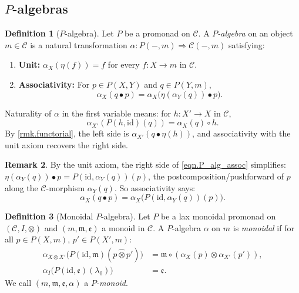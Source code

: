 \documentclass[11pt]{article}
\theoremstyle{definition}
\newtheorem{definition}{Definition}[section]
\newtheorem{remark}[definition]{Remark}
\newcommand{\id}{\mathrm{id}}
\newcommand{\cat}[1]{\mathcal{#1}}
\begin{document}
\subsection{$P$-algebras}

\begin{definition}[$P$-algebra]\label{def.P_alg}
Let $P$ be a promonad on $\cat{C}$. A \emph{$P$-algebra} on an object $m\in\cat{C}$ is a natural transformation $\alpha\colon P(-,m)\Rightarrow\cat{C}(-,m)$ satisfying:
\begin{enumerate}
\item \textbf{Unit:} $\alpha_X(\eta(f))=f$ for every $f\colon X\to m$ in $\cat{C}$.
\item \textbf{Associativity:} For $p\in P(X,Y)$ and $q\in P(Y,m)$,
\begin{equation}\label{eqn.P_alg_assoc}
\alpha_X(q\bullet p)=\alpha_X\bigl(\eta(\alpha_Y(q))\bullet p\bigr).
\end{equation}
\end{enumerate}
Naturality of $\alpha$ in the first variable means: for $h\colon X'\to X$ in $\cat{C}$,
\begin{equation}\label{eqn.alpha_nat}
\alpha_{X'}(P(h,\id)(q))=\alpha_X(q)\circ h.
\end{equation}
By \cref{rmk.functorial}, the left side is $\alpha_{X'}(q\bullet\eta(h))$, and associativity with the unit axiom recovers the right side.
\end{definition}

\begin{remark}\label{rmk.assoc_push}
By the unit axiom, the right side of \eqref{eqn.P_alg_assoc} simplifies: $\eta(\alpha_Y(q))\bullet p=P(\id,\alpha_Y(q))(p)$, the postcomposition/pushforward of $p$ along the $\cat{C}$-morphism $\alpha_Y(q)$. So associativity says:
\[
\alpha_X(q\bullet p)=\alpha_X\bigl(P(\id,\alpha_Y(q))(p)\bigr).
\]
\end{remark}

\begin{definition}[Monoidal $P$-algebra]\label{def.monoidal_P_alg}
Let $P$ be a lax monoidal promonad on $(\cat{C},I,\otimes)$ and $(m,\mathfrak{m},\mathfrak{e})$ a monoid in $\cat{C}$. A $P$-algebra $\alpha$ on $m$ is \emph{monoidal} if for all $p\in P(X,m)$, $p'\in P(X',m)$:
\begin{align}
\alpha_{X\otimes X'}\bigl(P(\id,\mathfrak{m})(p\mathbin{\hat\otimes} p')\bigr)
  &=\mathfrak{m}\circ(\alpha_X(p)\otimes\alpha_{X'}(p')),\label{eqn.mon_alg_mult}\\
\alpha_I\bigl(P(\id,\mathfrak{e})(\lambda_0)\bigr)&=\mathfrak{e}.\label{eqn.mon_alg_unit}
\end{align}
We call $(m,\mathfrak{m},\mathfrak{e},\alpha)$ a \emph{$P$-monoid}.
\end{definition}
\end{document}

